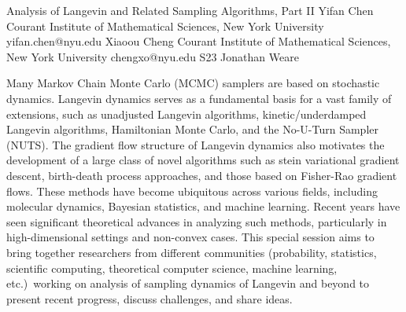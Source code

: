 

\clearpage

\begin{session}
 {Analysis of Langevin and Related Sampling Algorithms, Part II}%
 {Yifan Chen}%
 {Courant Institute of Mathematical Sciences, New York University}%
 {yifan.chen@nyu.edu}%
 {Xiaoou Cheng}%
 {Courant Institute of Mathematical Sciences, New York University}%
 {chengxo@nyu.edu}%
 {S23}%
 {Jonathan Weare}%

 Many Markov Chain Monte Carlo (MCMC) samplers are based on stochastic dynamics. Langevin dynamics serves as a fundamental basis for a vast family of extensions, such as unadjusted Langevin algorithms, kinetic/underdamped Langevin algorithms, Hamiltonian Monte Carlo, and the No-U-Turn Sampler (NUTS). The gradient flow structure of Langevin dynamics also motivates the development of a large class of novel algorithms such as stein variational gradient descent, birth-death process approaches, and those based on Fisher-Rao gradient flows. These methods have become ubiquitous across various fields, including molecular dynamics, Bayesian statistics, and machine learning. Recent years have seen significant theoretical advances in analyzing such methods, particularly in high-dimensional settings and non-convex cases. This special session aims to bring together researchers from different communities (probability, statistics, scientific computing, theoretical computer science, machine learning, etc.)\ working on analysis of sampling dynamics of Langevin and beyond to present recent progress, discuss challenges, and share ideas.
\end{session}



\clearpage

